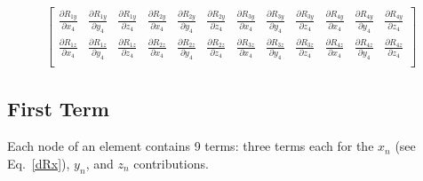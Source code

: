 \begin{eqnarray}
\begin{bmatrix}
\frac{\partial R_{1y}}{\partial x_4} & \frac{\partial R_{1y}}{\partial y_4} & \frac{\partial R_{1y}}{\partial z_4} & \frac{\partial R_{2y}}{\partial x_4} & \frac{\partial R_{2y}}{\partial y_4} & \frac{\partial R_{2y}}{\partial z_4} & \frac{\partial R_{3y}}{\partial x_4} & \frac{\partial R_{3y}}{\partial y_4} & \frac{\partial R_{3y}}{\partial z_4} & \frac{\partial R_{4y}}{\partial x_4} & \frac{\partial R_{4y}}{\partial y_4} & \frac{\partial R_{4y}}{\partial z_4} \\
\frac{\partial R_{1z}}{\partial x_4} & \frac{\partial R_{1z}}{\partial y_4} & \frac{\partial R_{1z}}{\partial z_4} & \frac{\partial R_{2z}}{\partial x_4} & \frac{\partial R_{2z}}{\partial y_4} & \frac{\partial R_{2z}}{\partial z_4} & \frac{\partial R_{3z}}{\partial x_4} & \frac{\partial R_{3z}}{\partial y_4} & \frac{\partial R_{3z}}{\partial z_4} & \frac{\partial R_{4z}}{\partial x_4} & \frac{\partial R_{4z}}{\partial y_4} & \frac{\partial R_{4z}}{\partial z_4} \\
\end{bmatrix}
\end{eqnarray}
%

\subsection{First Term}

Each node of an element contains 9 terms: three terms each for the $x_n$ (see Eq.\ \eqref{dRx}), $y_n$, and $z_n$ contributions. 

